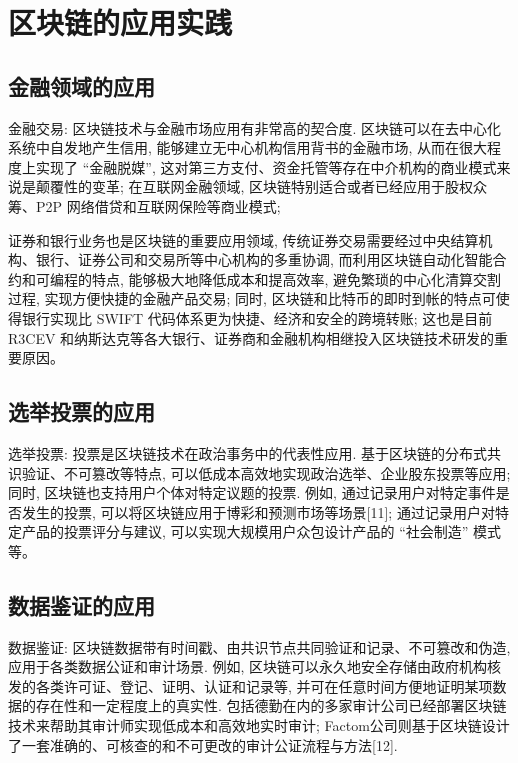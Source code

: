 \chapter{区块链的应用实践}

\section{金融领域的应用}

金融交易: 区块链技术与金融市场应用有非常高的契合度. 区块链可以在去中心化系统中自发地产生信用, 能够建立无中心机构信用背书的金融市场, 从而在很大程度上实现了 “金融脱媒”, 这对第三方支付、资金托管等存在中介机构的商业模式来说是颠覆性的变革; 在互联网金融领域, 区块链特别适合或者已经应用于股权众筹、P2P 网络借贷和互联网保险等商业模式; 

证券和银行业务也是区块链的重要应用领域, 传统证券交易需要经过中央结算机构、银行、证券公司和交易所等中心机构的多重协调, 而利用区块链自动化智能合约和可编程的特点, 能够极大地降低成本和提高效率, 避免繁琐的中心化清算交割过程, 实现方便快捷的金融产品交易; 同时, 区块链和比特币的即时到帐的特点可使得银行实现比 SWIFT 代码体系更为快捷、经济和安全的跨境转账; 这也是目前 R3CEV 和纳斯达克等各大银行、证券商和金融机构相继投入区块链技术研发的重要原因。


\section{选举投票的应用}

选举投票: 投票是区块链技术在政治事务中的代表性应用. 基于区块链的分布式共识验证、不可篡改等特点, 可以低成本高效地实现政治选举、企业股东投票等应用; 同时, 区块链也支持用户个体对特定议题的投票. 例如, 通过记录用户对特定事件是否发生的投票, 可以将区块链应用于博彩和预测市场等场景[11]; 通过记录用户对特定产品的投票评分与建议, 可以实现大规模用户众包设计产品的 “社会制造” 模式等。


\section{数据鉴证的应用}

数据鉴证: 区块链数据带有时间戳、由共识节点共同验证和记录、不可篡改和伪造,应用于各类数据公证和审计场景. 例如, 区块链可以永久地安全存储由政府机构核发的各类许可证、登记、证明、认证和记录等, 并可在任意时间方便地证明某项数据的存在性和一定程度上的真实性. 包括德勤在内的多家审计公司已经部署区块链技术来帮助其审计师实现低成本和高效地实时审计; Factom公司则基于区块链设计了一套准确的、可核查的和不可更改的审计公证流程与方法[12].

